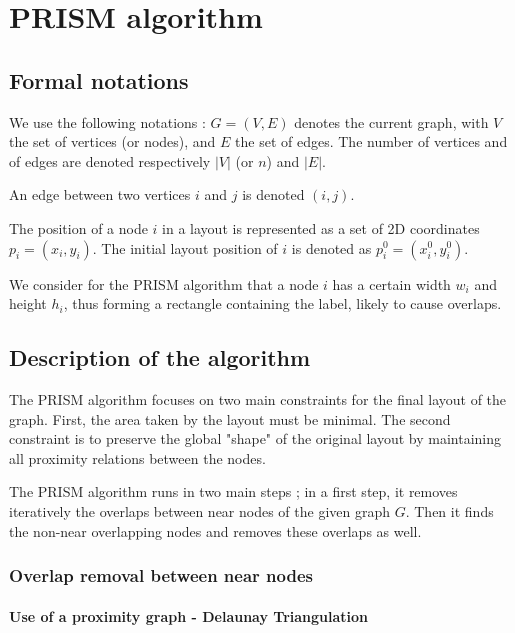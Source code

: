 \documentclass[12pt]{report}
\begin{document}


\chapter{PRISM algorithm}

\section{Formal notations}

We use the following notations : $G = (V,E)$ denotes the current graph, with $V$ the set of vertices (or nodes), and $E$ the set of edges. The number of vertices and of edges are denoted respectively $|V|$ (or $n$) and $|E|$.

An edge between two vertices $i$ and $j$ is denoted $(i,j)$.

The position of a node $i$ in a layout is represented as a set of 2D coordinates $p_i = (x_i, y_i)$. The initial layout position of $i$ is denoted as $p_i^0 = (x_i^0, y_i^0)$.

We consider for the PRISM algorithm that a node $i$ has a certain width $w_i$ and height $h_i$, thus forming a rectangle containing the label, likely to cause overlaps.

\section{Description of the algorithm}

The PRISM algorithm focuses on two main constraints for the final layout of the graph. First, the area taken by the layout must be minimal. The second constraint is to preserve the global "shape" of the original layout by maintaining all proximity relations between the nodes.

The PRISM algorithm runs in two main steps ; in a first step, it removes iteratively the overlaps between near nodes of the given graph $G$. Then it finds the non-near overlapping nodes and removes these overlaps as well.

\subsection{Overlap removal between near nodes}

\subsubsection{Use of a proximity graph - Delaunay Triangulation}
\end{document}
